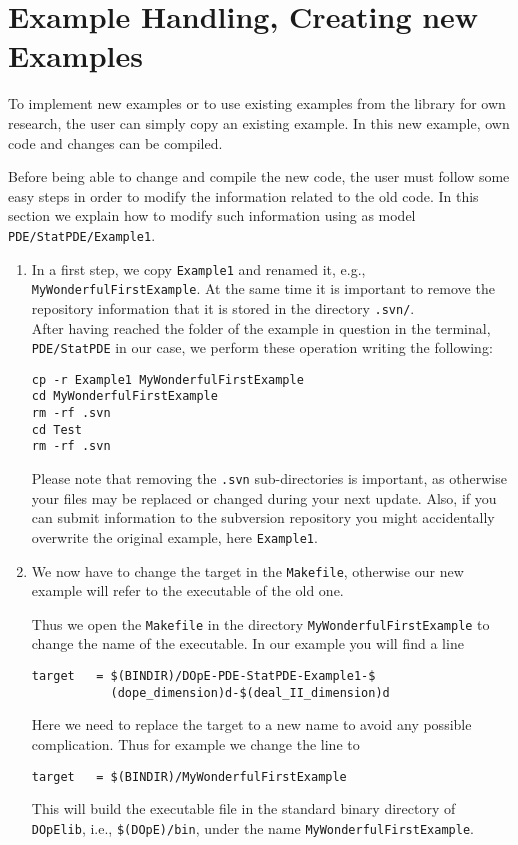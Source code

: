 \chapter{Example Handling, Creating new Examples}
\label{chap:howtoex}
To implement new examples or to use existing examples 
from the library for own research, the user 
can simply copy an existing example. In this 
new example, own code and changes can be compiled.

Before being able to change and compile the new code, the user must 
follow some easy steps in order to modify the information related to the old code. In 
this section we explain how to modify such information using as model 
\texttt{PDE/StatPDE/Example1}.

\begin{enumerate}
 \item In a first step, we copy \texttt{Example1} and renamed it, e.g., 
\texttt{MyWonderfulFirstExample}. At the same time it is important to remove the repository 
information that it is stored in the directory \texttt{.svn/}. \\
After having reached the folder of the example in question in the terminal, 
\texttt{PDE/StatPDE} in our case, we perform these operation writing the following:
\begin{verbatim}
cp -r Example1 MyWonderfulFirstExample
cd MyWonderfulFirstExample
rm -rf .svn
cd Test
rm -rf .svn
\end{verbatim}
Please note that removing the \texttt{.svn} sub-directories is important,
as otherwise your files may be replaced or changed during your next
update. Also, if you can submit information to the subversion repository 
you might accidentally overwrite the original example, here \texttt{Example1}.

\item We now have to change the target in the \texttt{Makefile}, 
  otherwise our new example will refer to the executable of the old one.
  
  Thus we open the \texttt{Makefile} in the directory \texttt{MyWonderfulFirstExample}
  to change the name of the executable. In our example you will find a line
\begin{verbatim}
target   = $(BINDIR)/DOpE-PDE-StatPDE-Example1-$
           (dope_dimension)d-$(deal_II_dimension)d
\end{verbatim}
Here we need to replace the target to a new name to avoid any 
possible complication. Thus for example we change the line to 
\begin{verbatim}
target   = $(BINDIR)/MyWonderfulFirstExample
\end{verbatim}
This will build the executable file in the standard binary directory 
of \texttt{DOpElib}, i.e., \texttt{\$(DOpE)/bin}, under the name 
\texttt{MyWonderfulFirstExample}.


\end{enumerate}
